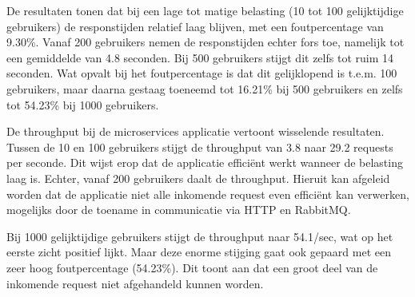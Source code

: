 De resultaten tonen dat bij een lage tot matige belasting (10 tot 100 gelijktijdige gebruikers) de responstijden relatief laag blijven, met een foutpercentage van 9.30\%. Vanaf 200 gebruikers nemen de responstijden echter fors toe, namelijk tot een gemiddelde van 4.8 seconden. Bij 500 gebruikers stijgt dit zelfs tot ruim 14 seconden. Wat opvalt bij het foutpercentage is dat dit gelijklopend is t.e.m. 100 gebruikers, maar daarna gestaag toeneemd tot 16.21\% bij 500 gebruikers en zelfs tot 54.23\% bij 1000 gebruikers.

De throughput bij de microservices applicatie vertoont wisselende resultaten. Tussen de 10 en 100 gebruikers stijgt de throughput van 3.8 naar 29.2 requests per seconde. Dit wijst erop dat de applicatie efficiënt werkt wanneer de belasting laag is. Echter, vanaf 200 gebruikers daalt de throughput. Hieruit kan afgeleid worden dat de applicatie niet alle inkomende request even efficiënt kan verwerken, mogelijks door de toename in communicatie via HTTP en RabbitMQ.

Bij 1000 gelijktijdige gebruikers stijgt de throughput naar 54.1/sec, wat op het eerste zicht positief lijkt. Maar deze enorme stijging gaat ook gepaard met een zeer hoog foutpercentage (54.23\%). Dit toont aan dat een groot deel van de inkomende request niet afgehandeld kunnen worden.


